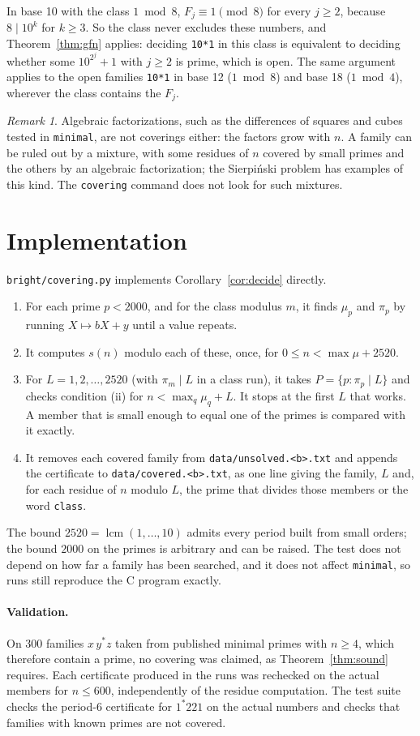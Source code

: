 \documentclass[11pt]{article}
\theoremstyle{definition}
\theoremstyle{remark}
\newtheorem{remark}[theorem]{Remark}
\newcommand{\code}[1]{\texttt{#1}}
\begin{document}
In base 10 with the class $1 \bmod 8$, $F_j\equiv 1\pmod 8$ for every $j\ge2$, because $8\mid 10^k$ for $k\ge3$. So the class never excludes these numbers, and Theorem~\ref{thm:gfn} applies: deciding \code{10*1} in this class is equivalent to deciding whether some $10^{2^j}+1$ with $j\ge2$ is prime, which is open. The same argument applies to the open families \code{10*1} in base 12 ($1 \bmod 8$) and base 18 ($1 \bmod 4$), wherever the class contains the $F_j$.

\begin{remark}
Algebraic factorizations, such as the differences of squares and cubes tested in \code{minimal}, are not coverings either: the factors grow with $n$. A family can be ruled out by a mixture, with some residues of $n$ covered by small primes and the others by an algebraic factorization; the Sierpi\'nski problem has examples of this kind. The \code{covering} command does not look for such mixtures.
\end{remark}

\section{Implementation}

\code{bright/covering.py} implements Corollary~\ref{cor:decide} directly.
\begin{enumerate}[label=\arabic*.]
\item For each prime $p<2000$, and for the class modulus $m$, it finds $\mu_p$ and $\pi_p$ by running $X\mapsto bX+y$ until a value repeats.
\item It computes $s(n)$ modulo each of these, once, for $0\le n<\max\mu+2520$.
\item For $L=1,2,\dots,2520$ (with $\pi_m\mid L$ in a class run), it takes $P=\{p:\pi_p\mid L\}$ and checks condition (ii) for $n<\max_{q}\mu_q+L$. It stops at the first $L$ that works. A member that is small enough to equal one of the primes is compared with it exactly.
\item It removes each covered family from \code{data/unsolved.<b>.txt} and appends the certificate to \code{data/covered.<b>.txt}, as one line giving the family, $L$ and, for each residue of $n$ modulo $L$, the prime that divides those members or the word \code{class}.
\end{enumerate}
The bound $2520=\operatorname{lcm}(1,\dots,10)$ admits every period built from small orders; the bound $2000$ on the primes is arbitrary and can be raised. The test does not depend on how far a family has been searched, and it does not affect \code{minimal}, so runs still reproduce the C program exactly.

\paragraph{Validation.} On 300 families $x\,y^*z$ taken from published minimal primes with $n\ge4$, which therefore contain a prime, no covering was claimed, as Theorem~\ref{thm:sound} requires. Each certificate produced in the runs was rechecked on the actual members for $n\le600$, independently of the residue computation. The test suite checks the period-6 certificate for $1^*221$ on the actual numbers and checks that families with known primes are not covered.
\end{document}
